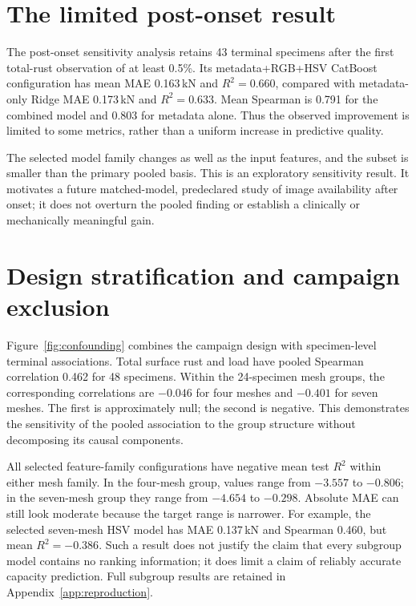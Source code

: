 \section{The limited post-onset result}
The post-onset sensitivity analysis retains 43 terminal specimens after the first total-rust observation of at least 0.5\%. Its metadata+RGB+HSV CatBoost configuration has mean MAE 0.163\,kN and $R^2=0.660$, compared with metadata-only Ridge MAE 0.173\,kN and $R^2=0.633$. Mean Spearman is 0.791 for the combined model and 0.803 for metadata alone. Thus the observed improvement is limited to some metrics, rather than a uniform increase in predictive quality.

The selected model family changes as well as the input features, and the subset is smaller than the primary pooled basis. This is an exploratory sensitivity result. It motivates a future matched-model, predeclared study of image availability after onset; it does not overturn the pooled finding or establish a clinically or mechanically meaningful gain.

\section{Design stratification and campaign exclusion}\label{sec:mesh}
Figure~\ref{fig:confounding} combines the campaign design with specimen-level terminal associations. Total surface rust and load have pooled Spearman correlation 0.462 for 48 specimens. Within the 24-specimen mesh groups, the corresponding correlations are $-0.046$ for four meshes and $-0.401$ for seven meshes. The first is approximately null; the second is negative. This demonstrates the sensitivity of the pooled association to the group structure without decomposing its causal components.


All selected feature-family configurations have negative mean test $R^2$ within either mesh family. In the four-mesh group, values range from $-3.557$ to $-0.806$; in the seven-mesh group they range from $-4.654$ to $-0.298$. Absolute MAE can still look moderate because the target range is narrower. For example, the selected seven-mesh HSV model has MAE 0.137\,kN and Spearman 0.460, but mean $R^2=-0.386$. Such a result does not justify the claim that every subgroup model contains no ranking information; it does limit a claim of reliably accurate capacity prediction. Full subgroup results are retained in Appendix~\ref{app:reproduction}.

